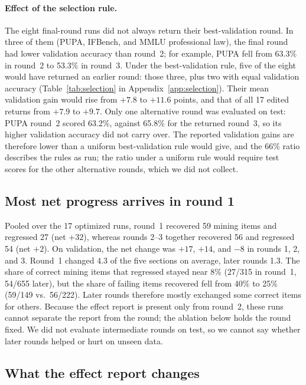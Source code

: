 \documentclass[11pt]{article}
\begin{document}
\paragraph{Effect of the selection rule.}
The eight final-round runs did not always return their best-validation round. In three of them (PUPA, IFBench, and MMLU professional law), the final round had lower validation accuracy than round~2; for example, PUPA fell from 63.3\% in round~2 to 53.3\% in round~3. Under the best-validation rule, five of the eight would have returned an earlier round: those three, plus two with equal validation accuracy (Table~\ref{tab:selection} in Appendix~\ref{app:selection}). Their mean validation gain would rise from $+7.8$ to $+11.6$ points, and that of all 17 edited returns from $+7.9$ to $+9.7$. Only one alternative round was evaluated on test: PUPA round~2 scored 63.2\%, against 65.8\% for the returned round~3, so its higher validation accuracy did not carry over. The reported validation gains are therefore lower than a uniform best-validation rule would give, and the 66\% ratio describes the rules as run; the ratio under a uniform rule would require test scores for the other alternative rounds, which we did not collect.

\subsection{Most net progress arrives in round 1}
\label{sec:rounds}
\label{sec:edits}

Pooled over the 17 optimized runs, round~1 recovered 59 mining items and regressed 27 (net $+32$), whereas rounds 2--3 together recovered 56 and regressed 54 (net $+2$). On validation, the net change was $+17$, $+14$, and $-8$ in rounds 1, 2, and 3. Round~1 changed 4.3 of the five sections on average, later rounds 1.3. The share of correct mining items that regressed stayed near 8\% (27/315 in round~1, 54/655 later), but the share of failing items recovered fell from 40\% to 25\% (59/149 vs.\ 56/222). Later rounds therefore mostly exchanged some correct items for others. Because the effect report is present only from round~2, these runs cannot separate the report from the round; the ablation below holds the round fixed. We did not evaluate intermediate rounds on test, so we cannot say whether later rounds helped or hurt on unseen data.

\subsection{What the effect report changes}
\label{sec:ablation}
\end{document}
